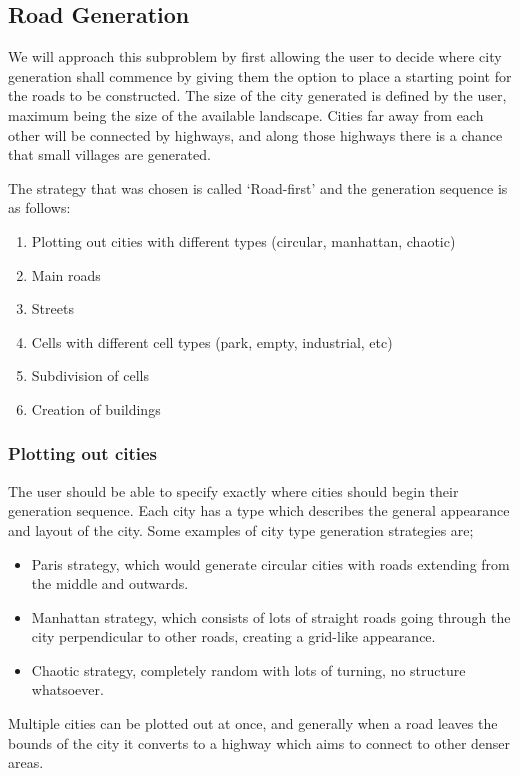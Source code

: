 \subsection{Road Generation}
We will approach this subproblem by first allowing the user to decide where city generation shall commence by giving them the option to place a starting point for the roads to be constructed.
The size of the city generated is defined by the user, maximum being the size of the available landscape.
Cities far away from each other will be connected by highways, and along those highways there is a chance that small villages are generated.

The strategy that was chosen is called `Road-first' and the generation sequence is as follows:
\begin{enumerate}
  \item Plotting out cities with different types (circular, manhattan, chaotic)
  \item Main roads
  \item Streets
  \item Cells with different cell types (park, empty, industrial, etc)
  \item Subdivision of cells
  \item Creation of buildings
\end{enumerate}

\subsubsection{Plotting out cities}
The user should be able to specify exactly where cities should begin their generation sequence.
Each city has a type which describes the general appearance and layout of the city.
Some examples of city type generation strategies are;
\begin{itemize}
  \item Paris strategy, which would generate circular cities with roads extending from the middle and outwards.
  \item Manhattan strategy, which consists of lots of straight roads going through the city perpendicular to other roads, creating a grid-like appearance.
  \item Chaotic strategy, completely random with lots of turning, no structure whatsoever.
\end{itemize}

Multiple cities can be plotted out at once, and generally when a road leaves the bounds of the city it converts to a highway which aims to connect to other denser areas.

